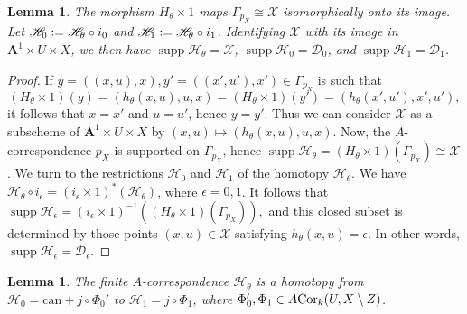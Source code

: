 \documentclass[a4paper, oneside, english,reqno]{amsart}
\theoremstyle{plain}
\newtheorem{lemma}[theorem]{Lemma}
\theoremstyle{definition}
\theoremstyle{remark}
\newcommand{\defeq}{\vcentcolon=}
\newcommand{\ACor}{A\mkern-3mu\Cor}
\newcommand{\A}{\mathbf{A}}
\newcommand{\scrD}{\mathscr{D}}
\newcommand{\scrH}{\mathscr{H}}
\newcommand{\scrX}{\mathscr{X}}
\newcommand{\can}{\mathrm{can}}
\DeclareMathOperator{\supp}{supp}
\DeclareMathOperator{\Cor}{Cor}
\begin{document}
\begin{lemma}\label{lemma:support}
The morphism $H_\theta\times1$ maps $\Gamma_{p_X}\cong\scrX$ isomorphically onto its image. Let $\scrH_0\defeq\scrH_\theta\circ i_0$ and $\scrH_1\defeq\scrH_\theta\circ i_1$. Identifying $\scrX$ with its image in $\A^1\times U\times X$, we then have $\supp\scrH_\theta=\scrX$, $\supp\scrH_0=\scrD_0$, and $\supp\scrH_1=\scrD_1$.
\end{lemma}

\begin{proof}
If $y=((x,u),x),y'=((x',u'),x')\in\Gamma_{p_X}$ is such that
\[
(H_\theta\times1)(y)=(h_\theta(x,u),u,x)=(H_\theta\times1)(y')=(h_\theta(x',u'),x',u'),
\]
it follows that $x=x'$ and $u=u'$, hence $y=y'$. Thus we can consider $\scrX$ as a subscheme of $\A^1\times U\times X$ by $(x,u)\mapsto(h_\theta(x,u),u,x)$. Now, the $A$-correspondence $p_X$ is supported on $\Gamma_{p_X}$, hence $\supp\scrH_\theta=(H_\theta\times1)(\Gamma_{p_X})\cong\scrX$. We turn to the restrictions $\scrH_0$ and $\scrH_1$ of the homotopy $\scrH_\theta$. We have  $\scrH_\theta\circ i_\epsilon=(i_\epsilon\times1)^*(\scrH_\theta)$, where $\epsilon=0,1$. It follows that $\supp\scrH_\epsilon=(i_\epsilon\times1)^{-1}((H_\theta\times1)(\Gamma_{p_X})),$ and this closed subset is determined by those points $(x,u)\in\scrX$ satisfying $h_\theta(x,u)=\epsilon$. In other words, $\supp\scrH_\epsilon=\scrD_\epsilon$.
\end{proof}

\begin{lemma}\label{lemma:finding-Phi}
The finite $A$-correspondence $\scrH_\theta$ is a homotopy from $\scrH_0=\can+j\circ \Phi_0'$ to $\scrH_1=j\circ\Phi_1$, where $\Phi_0',\Phi_1\in\ACor_k(U,X\setminus Z)$.
\end{lemma}
\end{document}
